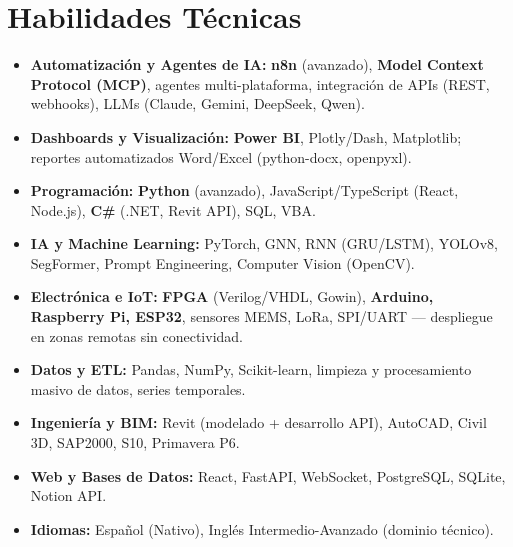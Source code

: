 \documentclass[10pt, a4paper]{article}
\begin{document}
\section*{Habilidades Técnicas}
\begin{itemize}
    \item \textbf{Automatización y Agentes de IA:} \textbf{n8n} (avanzado), \textbf{Model Context Protocol (MCP)}, agentes multi-plataforma, integración de APIs (REST, webhooks), LLMs (Claude, Gemini, DeepSeek, Qwen).
    \item \textbf{Dashboards y Visualización:} \textbf{Power BI}, Plotly/Dash, Matplotlib; reportes automatizados Word/Excel (python-docx, openpyxl).
    \item \textbf{Programación:} \textbf{Python} (avanzado), JavaScript/TypeScript (React, Node.js), \textbf{C\#} (.NET, Revit API), SQL, VBA.
    \item \textbf{IA y Machine Learning:} PyTorch, GNN, RNN (GRU/LSTM), YOLOv8, SegFormer, Prompt Engineering, Computer Vision (OpenCV).
    \item \textbf{Electrónica e IoT:} \textbf{FPGA} (Verilog/VHDL, Gowin), \textbf{Arduino, Raspberry Pi, ESP32}, sensores MEMS, LoRa, SPI/UART — despliegue en zonas remotas sin conectividad.
    \item \textbf{Datos y ETL:} Pandas, NumPy, Scikit-learn, limpieza y procesamiento masivo de datos, series temporales.
    \item \textbf{Ingeniería y BIM:} Revit (modelado + desarrollo API), AutoCAD, Civil 3D, SAP2000, S10, Primavera P6.
    \item \textbf{Web y Bases de Datos:} React, FastAPI, WebSocket, PostgreSQL, SQLite, Notion API.
    \item \textbf{Idiomas:} Español (Nativo), Inglés Intermedio-Avanzado (dominio técnico).
\end{itemize}

\end{document}
